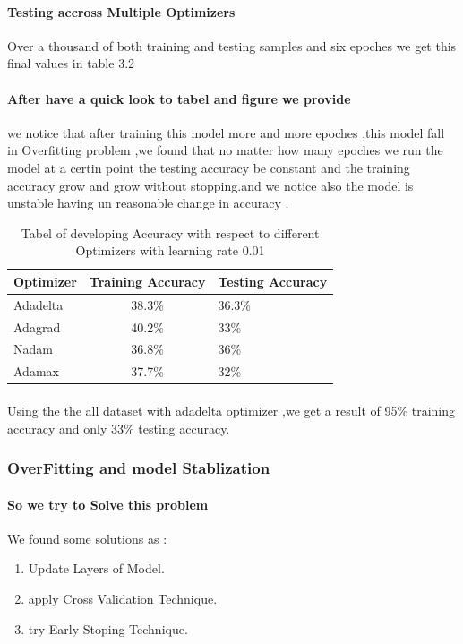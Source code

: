 \paragraph{Testing accross Multiple Optimizers}
Over a thousand of both training and testing samples and six epoches we get this final values in table 3.2

\paragraph{After have a quick look to tabel and figure we provide}
we notice that after training this model more and more epoches ,this model fall in Overfitting problem ,we found that no matter how many epoches we run the model at a certin point the testing accuracy be constant and the training accuracy grow and grow without stopping.and we notice also the model is unstable having un reasonable change in accuracy . 
\begin{table}[h!]
	\begin{center}
		\caption{Tabel of developing Accuracy with respect to different Optimizers with learning rate 0.01 \newline}
		\begin{tabular}{l|c|l}
			\textbf{Optimizer} & \textbf{Training Accuracy} & \textbf{Testing Accuracy}\\ 
			\hline 
			Adadelta & 38.3\% & 36.3\% \\
			Adagrad & 40.2\% & 33\%\\
			Nadam & 36.8\% & 36\% \\
			Adamax & 37.7\% & 32\% \\
		\end{tabular}
	\end{center}
\end{table}
\paragraph{}
Using the the all dataset with adadelta optimizer ,we get a result of 95\% training accuracy and only 33\% testing accuracy.
\subsubsection{OverFitting and model Stablization}
\paragraph{So we try to Solve this problem }
We found some solutions as :
\begin{enumerate}
	\item Update Layers of Model.
	\item apply Cross Validation Technique.
	\item try Early Stoping Technique.
\end{enumerate}
